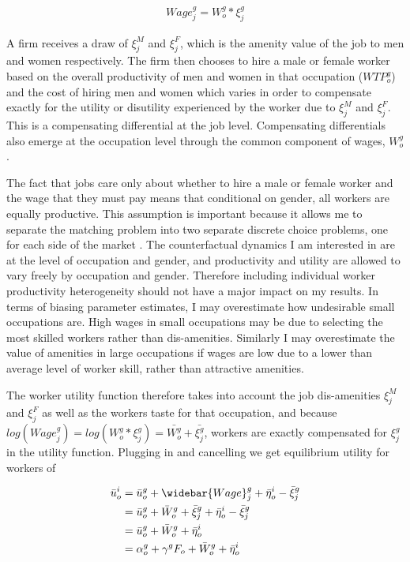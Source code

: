 \documentclass[12pt]{article}
\begin{document}
\begin{align}
Wage^g_j = W^g_o * \xi^g_j 
\end{align}


A firm receives a draw of $\xi^M_j$ and $\xi^F_j$, which is the amenity value of the job to men and women respectively. The firm then chooses to hire a male or female worker based on the overall productivity of men and women in that occupation ($WTP^g_o$) and the cost of hiring men and women which varies in order to compensate exactly for the utility or disutility experienced by the worker due to $\xi^M_j$ and $\xi^F_j$. This is a compensating differential at the job level. Compensating differentials also emerge at the occupation level through the common component of wages, $W^g_o$.

The fact that jobs care only about whether to hire a male or female worker and the wage that they must pay means that conditional on gender, all workers are equally productive. This assumption is important because it allows me to separate the matching problem into two separate discrete choice problems, one for each side of the market \cite{Galichon2013}. The counterfactual dynamics I am interested in are at the level of occupation and gender, and productivity and utility are allowed to vary freely by occupation and gender. Therefore including individual worker productivity heterogeneity should not have a major impact on my results. In terms of biasing parameter estimates, I may overestimate how undesirable small occupations are. High wages in small occupations may be due to selecting the most skilled workers rather than dis-amenities. Similarly I may overestimate the value of amenities in large occupations if wages are low due to a lower than average level of worker skill, rather than attractive amenities.

The worker utility function therefore takes into account the job dis-amenities $\xi^M_j$ and $\xi^F_j$ as well as the workers taste for that occupation, and because $log(Wage^g_j) = log(W^g_o * \xi^g_j) = \bar{W^g_o} + \bar{\xi^g_j}$, workers are exactly compensated for $ \xi^g_j$ in the utility function. Plugging in and cancelling we get equilibrium utility for workers of

\begin{align} \label{utility}
\bar{u}^i_o &= \bar{u}^{g}_o + \widebar{Wage}^g_j   + \bar{\eta}^i_o - \bar{\xi}^g_j  \\ \nonumber
&= \bar{u}^{g}_o +  \bar{W}^g_o + \bar{\xi}^g_j  + \bar{\eta}^i_o - \bar{\xi}^g_j  \\ \nonumber
&=  \bar{u}^{g}_o + \bar{W}^g_o  + \bar{\eta}^i_o  \\ \nonumber
&=  \alpha^g_o + \gamma^g F_o + \bar{W}^g_o  + \bar{\eta}^i_o 
\end{align}
\end{document}
